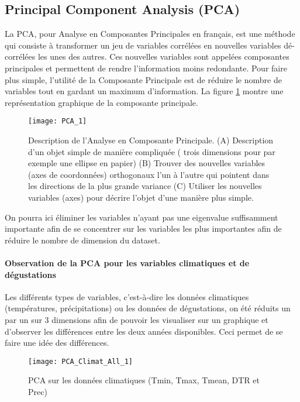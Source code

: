 \subsection{Principal Component Analysis (PCA)}\label{PCAss}
La PCA, pour Analyse en Composantes Principales en français, est une méthode qui consiste à transformer un jeu de variables corrélées en nouvelles variables dé-corrélées les unes des autres. Ces nouvelles variables sont appelées composantes principales et permettent de rendre l'information moins redondante. Pour faire plus simple, l'utilité de la Composante Principale est de réduire le nombre de variables tout en gardant un maximum d'information. La figure \ref{PCAdefinition} montre une représentation graphique de la composante principale. 


\begin{figure}[H]
	\texttt{[image: PCA\_1]}
	\caption{\label{PCAdefinition} Description de l'Analyse en Composante Principale. (A) Description d'un objet simple de manière compliquée ( trois dimensions pour par exemple une ellipse en papier) (B) Trouver des nouvelles variables (axes de coordonnées) orthogonaux l'un à l'autre qui pointent dans les directions de la plus grande variance (C) Utiliser les nouvelles variables (axes) pour décrire l'objet d'une manière plus simple. }
\end{figure}

On pourra ici éliminer les variables n'ayant pas une eigenvalue suffisamment importante afin de se concentrer sur les variables les plus importantes afin de réduire le nombre de dimension du dataset. 





\paragraph{Observation de la PCA pour les variables climatiques et de dégustations} Les différents types de variables, c'est-à-dire les données climatiques (températures, précipitations) ou les données de dégustations, on été réduits un par un sur 3 dimensions afin de pouvoir les visualiser sur un graphique et d'observer les différences entre les deux années disponibles. Ceci permet de se faire une idée des différences.  

\begin{figure}[H]
	\texttt{[image: PCA\_Climat\_All\_1]}
	\caption{\label{PCAClimatAll} PCA sur les données climatiques (Tmin, Tmax, Tmean, DTR et Prec) }
\end{figure}

